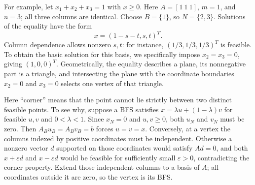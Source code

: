\documentclass[11pt,a4paper]{article}
\begin{document}
For example, let $x_1+x_2+x_3=1$ with $x\geq0$.
Here $A=[1\ 1\ 1]$, $m=1$, and $n=3$; all three columns are identical.
Choose $B=\{1\}$, so $N=\{2,3\}$. Solutions of the equality have the form
\[
  x=(1-s-t,s,t)^T.
\]
Column dependence allows nonzero $s,t$: for instance,
$(1/3,1/3,1/3)^T$ is feasible. To obtain the basic solution for this basis,
we specifically impose $x_2=x_3=0$, giving $(1,0,0)^T$.
Geometrically, the equality describes a plane, its nonnegative part is a
triangle, and intersecting the plane with the coordinate boundaries
$x_2=0$ and $x_3=0$ selects one vertex of that triangle.

Here ``corner'' means that the point cannot lie strictly between two distinct
feasible points. To see why, suppose a BFS satisfies
$x=\lambda u+(1-\lambda)v$ for feasible $u,v$ and $0<\lambda<1$.
Since $x_N=0$ and $u,v\geq0$, both $u_N$ and $v_N$ must be zero.
Then $A_Bu_B=A_Bv_B=b$ forces $u=v=x$.
Conversely, at a vertex the columns indexed by positive coordinates must be
independent. Otherwise a nonzero vector $d$ supported on those coordinates
would satisfy $Ad=0$, and both $x+\varepsilon d$ and $x-\varepsilon d$
would be feasible for sufficiently small $\varepsilon>0$, contradicting
the corner property. Extend those independent columns to a basis of $A$;
all coordinates outside it are zero, so the vertex is its BFS.
\end{document}
